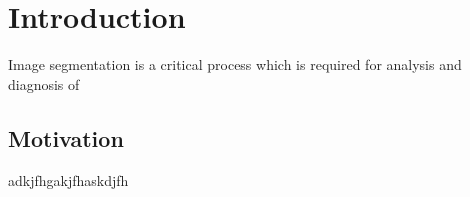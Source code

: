 \chapter{Introduction}
Image segmentation is a critical process which is required for analysis and diagnosis of  
\section{Motivation}
adkjfhgakjfhaskdjfh


